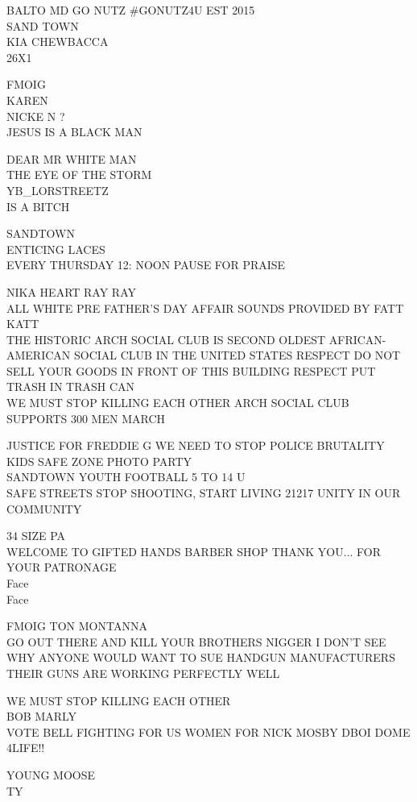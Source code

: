 \documentclass[10pt,letterpaper]{article}
\begin{document}
BALTO MD GO NUTZ \#GONUTZ4U EST 2015\\
SAND TOWN\\
KIA CHEWBACCA\\
26X1

FMOIG\\
KAREN\\
NICKE N ?\\
JESUS IS A BLACK MAN

DEAR MR WHITE MAN\\
THE EYE OF THE STORM\\
YB\_LORSTREETZ\\
IS A BITCH

SANDTOWN\\
ENTICING LACES\\
EVERY THURSDAY 12: NOON PAUSE FOR PRAISE

NIKA HEART RAY RAY\\
ALL WHITE PRE FATHER'S DAY AFFAIR SOUNDS PROVIDED BY FATT KATT\\
THE HISTORIC ARCH SOCIAL CLUB IS SECOND OLDEST AFRICAN{-}AMERICAN SOCIAL CLUB IN THE UNITED STATES RESPECT DO NOT SELL YOUR GOODS IN FRONT OF THIS BUILDING RESPECT PUT TRASH IN TRASH CAN\\
WE MUST STOP KILLING EACH OTHER ARCH SOCIAL CLUB SUPPORTS 300 MEN MARCH

JUSTICE FOR FREDDIE G WE NEED TO STOP POLICE BRUTALITY\\
KIDS SAFE ZONE PHOTO PARTY\\
SANDTOWN YOUTH FOOTBALL 5 TO 14 U\\
SAFE STREETS STOP SHOOTING, START LIVING 21217 UNITY IN OUR COMMUNITY

34 SIZE PA\\
WELCOME TO GIFTED HANDS BARBER SHOP THANK YOU... FOR YOUR PATRONAGE\\
Face\\
Face

FMOIG TON MONTANNA\\
GO OUT THERE AND KILL YOUR BROTHERS NIGGER I DON'T SEE WHY ANYONE WOULD WANT TO SUE HANDGUN MANUFACTURERS THEIR GUNS ARE WORKING PERFECTLY WELL

WE MUST STOP KILLING EACH OTHER\\
BOB MARLY\\
VOTE BELL FIGHTING FOR US WOMEN FOR NICK MOSBY DBOI DOME\\
4LIFE!!

YOUNG MOOSE\\
TY
\end{document}
